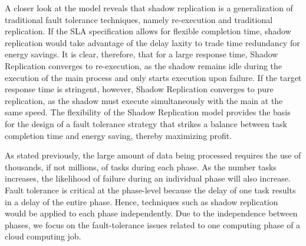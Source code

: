 

A closer look at the model reveals that shadow
replication is a generalization of traditional fault tolerance
techniques, namely re-execution and traditional replication. If the
SLA specification allows for flexible completion time, shadow
replication would take advantage of the delay laxity to trade time
redundancy for energy savings. It is clear, therefore, that for a
large response time, Shadow Replication converges to re-execution, as
the shadow remains idle during the execution of the main process and
only starts execution upon failure. If the target response time is
stringent, however, Shadow Replication converges to pure replication,
as the shadow must execute simultaneously with the main at the same
speed. The flexibility of the Shadow Replication model provides the
basis for the design of a fault tolerance strategy that strikes a
balance between task completion time and energy saving, thereby
maximizing profit.

As stated previously, the large amount of data being
processed requires the use of thousands, if not millions, of tasks during each phase. As
the number tasks increases, the likelihood of failure during an
individual phase will also increase. Fault tolerance is critical at
the phase-level because the delay of one task results in a delay of
the entire phase. Hence, techniques such as shadow replication would
be applied to each phase independently. Due to the independence
between phases, we focus on the fault-tolerance issues related to one computing phase 
of a cloud computing job.


